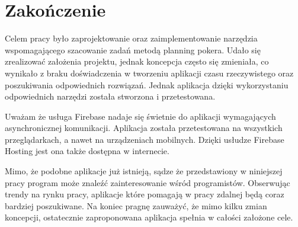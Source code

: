 \chapter*{Zakończenie}

Celem pracy było zaprojektowanie oraz zaimplementowanie narzędzia wspomagającego szacowanie zadań metodą planning pokera.
Udało się zrealizować założenia projektu, jednak koncepcja często się zmieniała,
co wynikało z braku doświadczenia w tworzeniu aplikacji czasu rzeczywistego oraz poszukiwania odpowiednich rozwiązań.
Jednak aplikacja dzięki wykorzystaniu odpowiednich narzędzi została stworzona i przetestowana.

Uważam że usługa Firebase nadaje się świetnie do aplikacji wymagających asynchronicznej komunikacji.
Aplikacja została przetestowana na wszystkich przeglądarkach, a nawet na urządzeniach mobilnych.
Dzięki usłudze Firebase Hosting jest ona także dostępna w internecie.

Mimo, że podobne aplikacje już istnieją,
sądze że przedstawiony w niniejszej pracy program może znaleźć zainteresowanie wśród programistów.
Obserwując trendy na rynku pracy, aplikacje które pomagają w pracy zdalnej będą coraz bardziej poszukiwane.
Na koniec pragnę zauważyć, że mimo kilku zmian koncepcji, ostatecznie zaproponowana aplikacja spełnia w całości założone cele.
